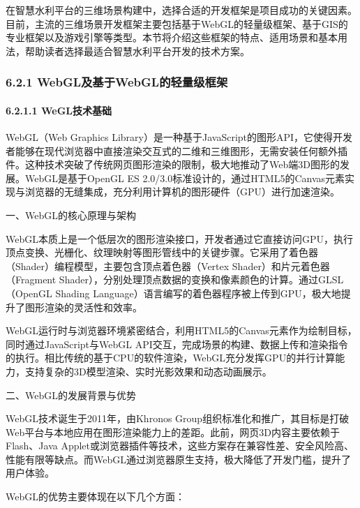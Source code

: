 在智慧水利平台的三维场景构建中，选择合适的开发框架是项目成功的关键因素。目前，主流的三维场景开发框架主要包括基于WebGL的轻量级框架、基于GIS的专业框架以及游戏引擎等类型。本节将介绍这些框架的特点、适用场景和基本用法，帮助读者选择最适合智慧水利平台开发的技术方案。

\hypertarget{webglux53caux57faux4e8ewebglux7684ux8f7bux91cfux7ea7ux6846ux67b6}{%
\subsubsection{6.2.1 WebGL及基于WebGL的轻量级框架}\label{webglux53caux57faux4e8ewebglux7684ux8f7bux91cfux7ea7ux6846ux67b6}}

\hypertarget{weglux6280ux672fux57faux7840}{%
\paragraph{6.2.1.1 WeGL技术基础}\label{weglux6280ux672fux57faux7840}}

WebGL（Web Graphics Library）是一种基于JavaScript的图形API，它使得开发者能够在现代浏览器中直接渲染交互式的二维和三维图形，无需安装任何额外插件。这种技术突破了传统网页图形渲染的限制，极大地推动了Web端3D图形的发展。WebGL是基于OpenGL ES 2.0/3.0标准设计的，通过HTML5的Canvas元素实现与浏览器的无缝集成，充分利用计算机的图形硬件（GPU）进行加速渲染。

一、WebGL的核心原理与架构

WebGL本质上是一个低层次的图形渲染接口，开发者通过它直接访问GPU，执行顶点变换、光栅化、纹理映射等图形管线中的关键步骤。它采用了着色器（Shader）编程模型，主要包含顶点着色器（Vertex Shader）和片元着色器（Fragment Shader），分别处理顶点数据的变换和像素颜色的计算。通过GLSL（OpenGL Shading Language）语言编写的着色器程序被上传到GPU，极大地提升了图形渲染的灵活性和效率。

WebGL运行时与浏览器环境紧密结合，利用HTML5的Canvas元素作为绘制目标，同时通过JavaScript与WebGL API交互，完成场景的构建、数据上传和渲染指令的执行。相比传统的基于CPU的软件渲染，WebGL充分发挥GPU的并行计算能力，支持复杂的3D模型渲染、实时光影效果和动态动画展示。

二、WebGL的发展背景与优势

WebGL技术诞生于2011年，由Khronos Group组织标准化和推广，其目标是打破Web平台与本地应用在图形渲染能力上的差距。此前，网页3D内容主要依赖于Flash、Java Applet或浏览器插件等技术，这些方案存在兼容性差、安全风险高、性能有限等缺点。而WebGL通过浏览器原生支持，极大降低了开发门槛，提升了用户体验。

WebGL的优势主要体现在以下几个方面：

